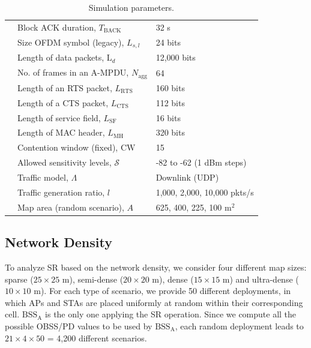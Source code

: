 \documentclass[preprint,12pt]{elsarticle}
\begin{document}
\begin{table}[h]
{\begin{tabular}{c|l|l|}
			\cline{2-3} 
			\multicolumn{1}{|c|}{} & Block ACK duration, $T_\text{BACK}$ & 32 \textmu s \\
			\cline{2-3} 
			\multicolumn{1}{|c|}{} &  Size OFDM symbol (legacy), $L_{s,l}$ & 24 bits \\
			\cline{2-3} 
			\multicolumn{1}{|c|}{} & Length of data packets, $\text{L}_{d}$ & 12,000 bits \\
			\cline{2-3} 
			\multicolumn{1}{|c|}{} & No. of frames in an A-MPDU, $N_{\text{agg}}$ & 64 \\
			\cline{2-3} 
			\multicolumn{1}{|c|}{} & Length of an RTS packet, $L_\text{RTS}$ & 160 bits \\
			\cline{2-3} 
			\multicolumn{1}{|c|}{} & Length of a CTS packet, $L_\text{CTS}$ & 112 bits \\
			\cline{2-3} 
			\multicolumn{1}{|c|}{} & Length of service field, $L_\text{SF}$ & 16 bits  \\
			\cline{2-3} 
			\multicolumn{1}{|c|}{} & Length of MAC header, $L_\text{MH}$ & 320 bits \\
			\cline{2-3} 
			\multicolumn{1}{|c|}{} & Contention window (fixed), $\text{CW}$ & 15 \\
			\cline{2-3} 
			\multicolumn{1}{|c|}{} & Allowed sensitivity levels, $\mathcal{S}$ & -82 to -62 (1 dBm steps) \\
			\hline
			\multicolumn{1}{|c|}{\multirow{2}{*}{\centering\rotatebox[origin=c]{90}{Misc.  }}} & Traffic model, $\Lambda$ & Downlink (UDP)\\
			\cline{2-3} 
			\multicolumn{1}{|c|}{} & Traffic generation ratio, $l$ & 1,000, 2,000, 10,000 pkts/s\\ 
			\cline{2-3} 
			\multicolumn{1}{|c|}{} & Map area (random scenario), $A$ & 625, 400, 225, 100 m$^2$\\
			\hline
	\end{tabular}}
	\caption{Simulation parameters.}
	\label{table:parameters}
\end{table}

\subsection{Network Density}
\label{section:random_scenarios_density}
To analyze SR based on the network density, we consider four different map sizes: sparse ($25\times25$ m), semi-dense ($20\times20$ m), dense ($15\times15$ m) and ultra-dense ($10\times10$ m). For each type of scenario, we provide 50 different deployments, in which APs and STAs are placed uniformly at random within their corresponding cell. $\text{BSS}_\text{A}$ is the only one applying the SR operation. Since we compute all the possible OBSS/PD values to be used by $\text{BSS}_\text{A}$, each random deployment leads to $21\times4\times50$ = 4,200 different scenarios.
\end{document}
